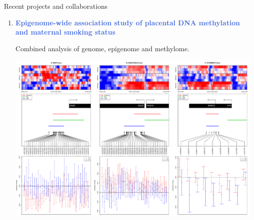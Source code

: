 \documentclass[final]{beamer}
\newlength{\twocolwid}
\begin{document}
\begin{frame}[t]
\begin{columns}[t]
\begin{column}{\twocolwid}
\begin{block}{Recent projects and collaborations}
\begin{enumerate}
\item \textcolor{RoyalBlue}{\textbf{Epigenome-wide association study of placental DNA methylation and maternal smoking status}}

Combined analysis of genome, epigenome and methylome.

\begin{center}
	\includegraphics[width=\linewidth]{figs/fig_3loci}
\end{center}

\end{enumerate}

\end{block}






\end{column}
\end{columns}
\end{frame}
\end{document}
